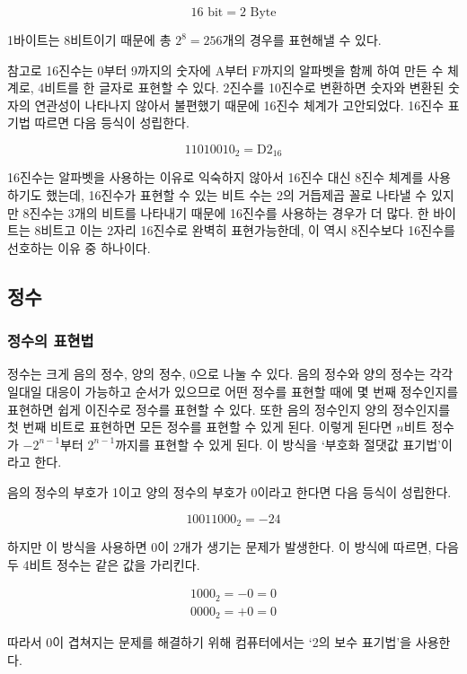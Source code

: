 \documentclass{article}
\begin{document}
$$
16 \text{ bit} = 2 \text{ Byte}
$$

1바이트는 8비트이기 때문에 총 $2^8 = 256$개의 경우를 표현해낼 수 있다.

참고로 16진수는 0부터 9까지의 숫자에 A부터 F까지의 알파벳을 함께 하여 만든 수 체계로,
4비트를 한 글자로 표현할 수 있다. 2진수를 10진수로 변환하면 숫자와 변환된 숫자의 연관성이
나타나지 않아서 불편했기 때문에 16진수 체계가 고안되었다.
16진수 표기법 따르면 다음 등식이 성립한다.

$$
1101 0010_2 = \text{D2}_{16}
$$

16진수는 알파벳을 사용하는 이유로 익숙하지 않아서 16진수 대신 8진수 체계를 사용하기도 했는데,
16진수가 표현할 수 있는
비트 수는 2의 거듭제곱 꼴로 나타낼 수 있지만 8진수는 3개의 비트를 나타내기 때문에 16진수를
사용하는 경우가 더 많다. 한 바이트는 8비트고 이는 2자리 16진수로 완벽히 표현가능한데, 이 역시
8진수보다 16진수를 선호하는 이유 중 하나이다.

\subsection{정수}

\subsubsection{정수의 표현법}

정수는 크게 음의 정수, 양의 정수, 0으로 나눌 수 있다. 음의 정수와 양의 정수는 각각 일대일
대응이 가능하고 순서가 있으므로 어떤 정수를 표현할 때에 몇 번째 정수인지를 표현하면 쉽게
이진수로 정수를 표현할 수 있다. 또한 음의 정수인지 양의 정수인지를 첫 번째 비트로 표현하면
모든 정수를 표현할 수 있게 된다. 이렇게 된다면 $n$비트 정수가 $-2^{n-1}$부터
$2^{n-1}$까지를 표현할 수 있게 된다. 이 방식을 `부호화 절댓값 표기법'이라고 한다.

음의 정수의 부호가 1이고 양의 정수의 부호가 0이라고 한다면 다음 등식이 성립한다.

$$
10011000_2 = -24
$$

하지만 이 방식을 사용하면 0이 2개가 생기는 문제가 발생한다. 이 방식에 따르면,
다음 두 4비트 정수는 같은 값을 가리킨다.

$$
\begin{aligned}
    1000_2 = -0 = 0 \\
    0000_2 = +0 = 0
\end{aligned}
$$

따라서 0이 겹쳐지는 문제를 해결하기 위해 컴퓨터에서는 `2의 보수 표기법'을 사용한다.
\end{document}
